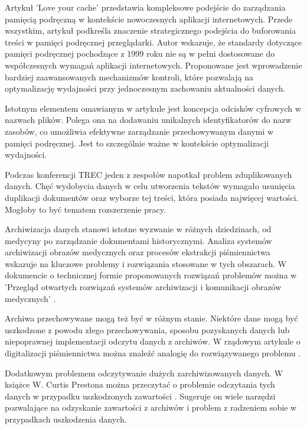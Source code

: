 Artykuł 'Love your cache' \cite{bib:internet:TwojaPamiećPodręczna} przedstawia
kompleksowe podejście do zarządzania 
pamięcią podręczną w kontekście nowoczesnych aplikacji internetowych. Przede 
wszystkim, artykuł podkreśla znaczenie strategicznego podejścia do buforowania 
treści w pamięci podręcznej przeglądarki. Autor wskazuje, że standardy 
dotyczące pamięci podręcznej pochodzące z 1999 roku nie są w pełni dostosowane 
do współczesnych wymagań aplikacji internetowych. Proponowane jest wprowadzenie
bardziej zaawansowanych mechanizmów kontroli, które pozwalają na optymalizację
wydajności przy jednoczesnym zachowaniu aktualności danych.

Istotnym elementem omawianym w artykule jest koncepcja odcisków cyfrowych w
nazwach plików. Polega ona na dodawaniu unikalnych identyfikatorów do nazw 
zasobów, co umożliwia efektywne zarządzanie przechowywanym danymi w pamięci 
podręcznej. Jest to szczególnie ważne w kontekście optymalizacji wydajności.

Podczas konferencji TREC \cite{bib:konferencja:TRECDuplicates} jeden z zespołów 
napotkał problem zduplikowanych danych. Chęć wydobycia danych w celu utworzenia
tekstów wymagało usunięcia duplikacji dokumentów oraz wyborze tej treści,
która posiada najwięcej wartości. Mogłoby to być tematem rozszerzenie pracy. 

Archiwizacja danych stanowi istotne wyzwanie w różnych dziedzinach, od medycyny 
po zarządzanie dokumentami historycznymi. Analiza systemów archiwizacji obrazów
medycznych oraz procesów ekstrakcji piśmiennictwa wskazuje na kluczowe problemy
i rozwiązania stosowane w tych obszarach. W dokumencie o technicznej formie
proponowanych rozwiązań problemów można w 'Przegląd otwartych rozwiązań systemów 
archiwizacji i komunikacji obrazów medycznych' \cite{bib:internet:ArchiwizacjaDanychMedycznych}.

Archiwa przechowywane mogą też być w różnym stanie. Niektóre dane mogą być
uszkodzone z powodu złego przechowywania, sposobu pozyskanych danych lub 
niepoprawnej implementacji odczytu danych z archiwów. W rządowym artykule o
digitalizacji piśmiennictwa można znaleźć analogię do rozwiązywanego problemu \cite{bib:internet:GovDigitalizacjaPiśmiennictwa}.

Dodatkowym problemem odczytywanie dużych zarchiwizowanych danych. W książce W.
Curtis Prestona można przeczytać o problemie odczytania tych danych w przypadku
uszkodzonych zawartości \cite{bib:ksiazka:ArchiwizacjaIOdzyskiwanie}. Sugeruje
on wiele narzędzi pozwalające na odzyskanie zawartości z archiwów i problem
z radzeniem sobie w przypadkach uszkodzenia danych.

